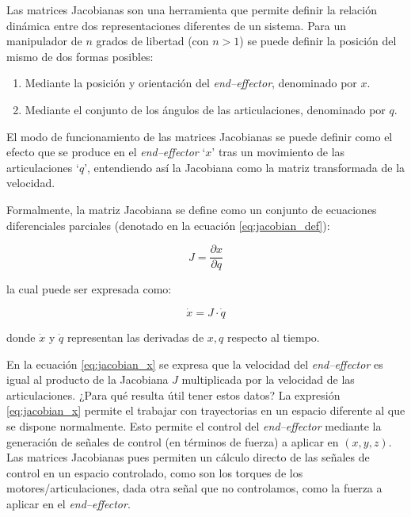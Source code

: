 Las matrices Jacobianas son una herramienta que permite definir la relación
dinámica entre dos representaciones diferentes de un sistema. Para un manipulador
de $n$ grados de libertad (con $n > 1$) se puede definir la posición del mismo de dos
formas posibles:

\begin{enumerate}
    \item Mediante la posición y orientación del \textit{end--effector}, denominado por $x$.
    \item Mediante el conjunto de los ángulos de las articulaciones, denominado por $q$.
\end{enumerate}

El modo de funcionamiento de las matrices Jacobianas se puede definir como el efecto
que se produce en el \textit{end--effector} `$x$' tras un movimiento de las articulaciones
`$q$', entendiendo así la Jacobiana como la matriz transformada de la velocidad.

Formalmente, la matriz Jacobiana se define como un conjunto de ecuaciones diferenciales
parciales (denotado en la ecuación \ref{eq:jacobian_def}):

\begin{equation}\label{eq:jacobian_def}
    J = \frac{\partial x}{\partial q}
\end{equation}

la cual puede ser expresada como:

\begin{equation}\label{eq:jacobian_x}
    \dot{x} = J \cdot \dot{q}
\end{equation}

donde $\dot{x}$ y $\dot{q}$ representan las derivadas de $x, q$ respecto al tiempo.

En la ecuación \ref{eq:jacobian_x} se expresa que la velocidad del \textit{end--effector}
es igual al producto de la Jacobiana $J$ multiplicada por la velocidad de las articulaciones.
¿Para qué resulta útil tener estos datos? La expresión \ref{eq:jacobian_x} permite el
trabajar con trayectorias en un espacio diferente al que se dispone normalmente\cite{travisdewolfRobotControlPart2013a}.
Esto permite el control del \textit{end--effector} mediante la
generación de señales de control (en términos de fuerza) a aplicar en $\left(x, y, z\right)$.
Las matrices Jacobianas pues permiten un cálculo directo de las señales de control en un
espacio controlado, como son los torques de los motores/articulaciones, dada otra señal
que no controlamos, como la fuerza a aplicar en el \textit{end--effector}.

